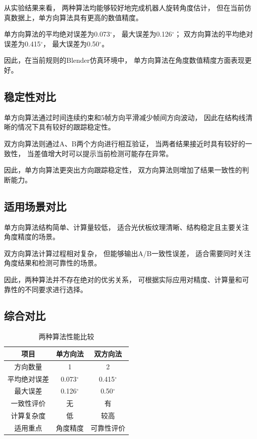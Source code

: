 \documentclass[UTF8,a4paper,12pt]{ctexart}
\begin{document}
	从实验结果来看， 
	两种算法均能够较好地完成机器人旋转角度估计， 
	但在当前仿真数据上，单方向算法具有更高的数值精度。 
	
	单方向算法的平均绝对误差为0.073$^\circ$， 
	最大误差为0.126$^\circ$； 
	双方向算法的平均绝对误差为0.415$^\circ$， 
	最大误差为0.50$^\circ$。 
	
	因此，在当前规则的Blender仿真环境中， 
	单方向算法在角度数值精度方面表现更好。 
	
	\subsection{稳定性对比} 
	
	单方向算法通过时间连续约束和5帧方向平滑减少帧间方向波动， 
	因此在结构线清晰的情况下具有较好的跟踪稳定性。 
	
	双方向算法则通过A、B两个方向进行相互验证， 
	当两者结果接近时具有较好的一致性， 
	当差值增大时可以提示当前检测可能存在异常。 
	
	因此，单方向算法更突出方向跟踪稳定性， 
	双方向算法则增加了结果一致性的判断能力。 
	
	\subsection{适用场景对比} 
	
	单方向算法结构简单、计算量较低， 
	适合光伏板纹理清晰、结构稳定且主要关注角度精度的场景。 
	
	双方向算法计算过程相对复杂， 
	但能够输出A/B一致性误差， 
	适合需要同时关注角度结果和检测可靠性的场景。 
	
	因此，两种算法并不存在绝对的优劣关系， 
	可根据实际应用对精度、计算量和可靠性的不同要求进行选择。 
	
	\subsection{综合对比} 
	
	\begin{table}[!htb] 
		\centering 
		\caption{两种算法性能比较} 
		\begin{tabular}{ccc} 
			\toprule 
			项目&单方向法&双方向法\\ 
			\midrule 
			方向数量&1&2\\ 
			平均绝对误差&0.073$^\circ$&0.415$^\circ$\\ 
			最大误差&0.126$^\circ$&0.50$^\circ$\\ 
			一致性评价&无&有\\ 
			计算复杂度&低&较高\\ 
			适用重点&角度精度&可靠性评价\\ 
			\bottomrule 
		\end{tabular} 
	\end{table} 
	
\end{document}
